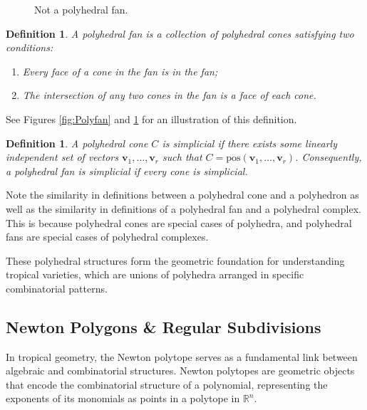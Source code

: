 \documentclass[11pt,reqno,a4paper]{article}
\theoremstyle{theoremstyle}
\theoremstyle{examplestyle}
\newtheorem{definition}[theorem]{Definition}
\theoremstyle{algorithmstyle}
\numberwithin{equation}{subsection}
\newcommand{\RR}{\mathbb{R}}
\begin{document}
\begin{figure}[h!]
    \centering
    \caption{Not a polyhedral fan.}
    \label{fig:Notpolyfan}
\end{figure}


\begin{definition}
    A \textit{polyhedral fan} is a collection of polyhedral cones satisfying two conditions:
    \begin{enumerate}[label = \textit{(\arabic*)}]
        \item Every face of a cone in the fan is in the fan;
        \item The intersection of any two cones in the fan is a face of each cone.
    \end{enumerate}
\end{definition}

See Figures \ref{fig:Polyfan} and \ref{fig:Notpolyfan} for an illustration of this definition.

\begin{definition} 
    A polyhedral cone $C$ is \textit{simplicial} if there exists some linearly independent set of vectors $\textbf{v}_1,\ldots,\mathbf{v}_r$ such that $C = \text{pos}(\mathbf{v}_1,\ldots,\mathbf{v}_r)$. Consequently, a polyhedral fan is \textit{simplicial} if every cone is \textit{simplicial}.
\end{definition}

Note the similarity in definitions between a polyhedral cone and a polyhedron as well as the similarity in definitions of a polyhedral fan and a polyhedral complex. This is because polyhedral cones are special cases of polyhedra, and polyhedral fans are special cases of polyhedral complexes.

These polyhedral structures form the geometric foundation for understanding tropical varieties, which are unions of polyhedra arranged in specific combinatorial patterns.

\subsection{Newton Polygons \& Regular Subdivisions}\label{section:Newtpoly}
In tropical geometry, the Newton polytope serves as a fundamental link between algebraic and combinatorial structures. Newton polytopes are geometric objects that encode the combinatorial structure of a polynomial, representing the exponents of its monomials as points in a polytope in $\RR^n$.
\end{document}
